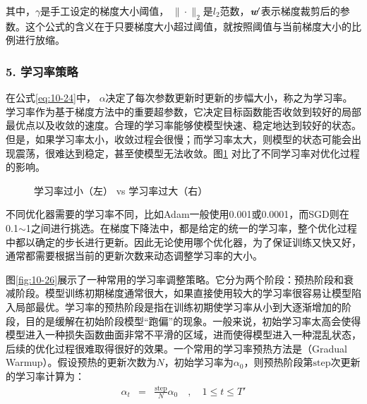\noindent 其中，$\gamma$是手工设定的梯度大小阈值， $\| \cdot \|_2$是$l_2$范数，$\textbf{\em w}'$表示梯度裁剪后的参数。这个公式的含义在于只要梯度大小超过阈值，就按照阈值与当前梯度大小的比例进行放缩。


\subsubsection{5. 学习率策略}
\vspace{0.5em}

\parinterval 在公式\eqref{eq:10-24}中， $\alpha$决定了每次参数更新时更新的步幅大小，称之为学习率。学习率作为基于梯度方法中的重要超参数，它决定目标函数能否收敛到较好的局部最优点以及收敛的速度。合理的学习率能够使模型快速、稳定地达到较好的状态。但是，如果学习率太小，收敛过程会很慢；而学习率太大，则模型的状态可能会出现震荡，很难达到稳定，甚至使模型无法收敛。图\ref{fig:10-25} 对比了不同学习率对优化过程的影响。

\begin{figure}[htp]
\centering

\caption{学习率过小（左） vs 学习率过大（右） }
\label{fig:10-25}
\end{figure}

\parinterval 不同优化器需要的学习率不同，比如Adam一般使用0.001或0.0001，而SGD则在0.1$\sim$1之间进行挑选。在梯度下降法中，都是给定的统一的学习率，整个优化过程中都以确定的步长进行更新。因此无论使用哪个优化器，为了保证训练又快又好，通常都需要根据当前的更新次数来动态调整学习率的大小。
\vspace{0.5em}


\parinterval 图\ref{fig:10-26}展示了一种常用的学习率调整策略。它分为两个阶段：预热阶段和衰减阶段。模型训练初期梯度通常很大，如果直接使用较大的学习率很容易让模型陷入局部最优。学习率的预热阶段是指在训练初期使学习率从小到大逐渐增加的阶段，目的是缓解在初始阶段模型“跑偏”的现象。一般来说，初始学习率太高会使得模型进入一种损失函数曲面非常不平滑的区域，进而使得模型进入一种混乱状态，后续的优化过程很难取得很好的效果。一个常用的学习率预热方法是{\small{}}（Gradual Warmup）。假设预热的更新次数为$N$，初始学习率为$\alpha_0$，则预热阶段第$\textrm{step}$次更新的学习率计算为：
\begin{eqnarray}
\alpha_t &=& \frac{\textrm{step}}{N} \alpha_0 \quad,\quad 1 \leq t \leq T'
\label{eq:10-29}
\end{eqnarray}

